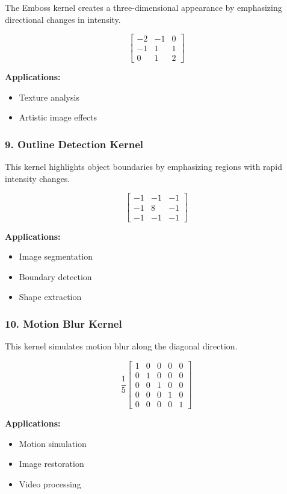 \documentclass[11pt]{article}
\begin{document}
The Emboss kernel creates a three-dimensional appearance by emphasizing
directional changes in intensity.

\[
\begin{bmatrix}
-2 & -1 & 0\\
-1 & 1 & 1\\
0 & 1 & 2
\end{bmatrix}
\]

\textbf{Applications:}
\begin{itemize}
\item Texture analysis
\item Artistic image effects
\end{itemize}

\subsubsection*{9. Outline Detection Kernel}

This kernel highlights object boundaries by emphasizing regions with
rapid intensity changes.

\[
\begin{bmatrix}
-1 & -1 & -1\\
-1 & 8 & -1\\
-1 & -1 & -1
\end{bmatrix}
\]

\textbf{Applications:}
\begin{itemize}
\item Image segmentation
\item Boundary detection
\item Shape extraction
\end{itemize}

\subsubsection*{10. Motion Blur Kernel}

This kernel simulates motion blur along the diagonal direction.

\[
\frac{1}{5}
\begin{bmatrix}
1 & 0 & 0 & 0 & 0\\
0 & 1 & 0 & 0 & 0\\
0 & 0 & 1 & 0 & 0\\
0 & 0 & 0 & 1 & 0\\
0 & 0 & 0 & 0 & 1
\end{bmatrix}
\]

\textbf{Applications:}
\begin{itemize}
\item Motion simulation
\item Image restoration
\item Video processing
\end{itemize}
\end{document}

